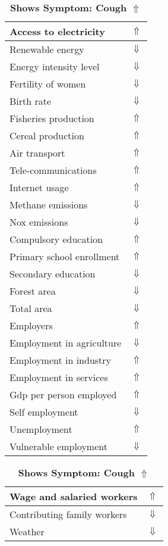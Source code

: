 \documentclass[12pt,notitlepage,oneside]{report}
\begin{document}
\begin{table}[!htb]
\caption{\textbf{Shows Symptom: Cough $\Uparrow$}}
\centering
\label{Correlated Socio-economic Factors0}
\begin{tabular}{|l|l|}
\hline
Access to electricity & $\Uparrow$\\ \hline
Renewable energy & $\Downarrow$\\ \hline
Energy intensity level & $\Downarrow$\\ \hline
Fertility of women & $\Downarrow$\\ \hline
Birth rate & $\Downarrow$\\ \hline
Fisheries production & $\Uparrow$\\ \hline
Cereal production & $\Uparrow$\\ \hline
Air transport  & $\Uparrow$\\ \hline
Tele-communications & $\Uparrow$\\ \hline
Internet usage & $\Uparrow$\\ \hline
Methane emissions & $\Downarrow$\\ \hline
Nox emissions & $\Downarrow$\\ \hline
Compulsory education & $\Uparrow$\\ \hline
Primary school enrollment & $\Uparrow$\\ \hline
Secondary education & $\Downarrow$\\ \hline
Forest area & $\Downarrow$\\ \hline
Total area & $\Downarrow$\\ \hline
Employers & $\Uparrow$\\ \hline
Employment in agriculture & $\Downarrow$\\ \hline
Employment in industry & $\Uparrow$\\ \hline
Employment in services & $\Uparrow$\\ \hline
Gdp per person employed & $\Uparrow$\\ \hline
Self employment & $\Downarrow$\\ \hline
Unemployment & $\Uparrow$\\ \hline
Vulnerable employment & $\Downarrow$\\ \hline
\end{tabular}
\begin{tabular}{|l|l|}
\hline
Wage and salaried workers & $\Uparrow$\\ \hline
Contributing family workers & $\Downarrow$\\ \hline
Weather & $\Downarrow$\\ \hline

\end{tabular}
\end{table}
\end{document}
